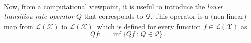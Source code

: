 \documentclass[twoside,11pt]{article}
\newcommand{\states}{\mathcal{X}}
\newcommand{\gambles}{\mathcal{L}}
\newcommand{\gamblesX}{\gambles(\states)}
\newcommand{\rateset}{\mathcal{Q}}
\newcommand{\lrate}{\underline{Q}}
\newcommand{\coloneqq}{:\!=}
\begin{document}
Now, from a computational viewpoint, it is useful to introduce the \emph{lower transition rate operator} $\lrate$ that corresponds to $\rateset$. This operator is a (non-linear) map from $\gamblesX$ to $\gamblesX$, which is defined for every function $f\in\gamblesX$ as
\begin{equation}\label{eq:lower_rate_is_inf}
\lrate f \coloneqq \inf\{ Qf\,:\, Q\in\rateset \}\,.
\end{equation}
\end{document}
